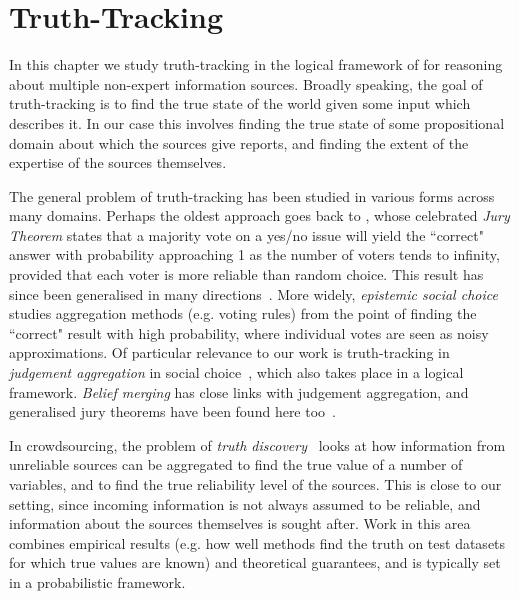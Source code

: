 \chapter{Truth-Tracking}


In this chapter we study truth-tracking in the logical framework of
\textcite{singleton_booth_22_preprint} for reasoning about multiple non-expert
information sources. Broadly speaking, the goal of truth-tracking is to find
the true state of the world given some input which describes it. In our case
this involves finding the true state of some propositional domain about which
the sources give reports, and finding the extent of the expertise of the
sources themselves.

The general problem of truth-tracking has been studied in various forms across
many domains. Perhaps the oldest approach goes back to \textcite{condorcet}, whose
celebrated \emph{Jury Theorem} states that a majority vote on a yes/no issue
will yield the ``correct" answer with probability approaching 1 as the number
of voters tends to infinity, provided that each voter is more reliable than
random choice. This result has since been generalised in many
directions~\textcite{grofman1983thirteen}. More widely, \emph{epistemic social
choice}~\cite{elkind2016rationalizations} studies aggregation methods (e.g.
voting rules) from the point of finding the ``correct" result with high
probability, where individual votes are seen as noisy approximations. Of
particular relevance to our work is truth-tracking in \emph{judgement
aggregation} in social
choice~\cite{hartmann_judgment_2012,TerzopoulouEndrissSAGT2019}, which also
takes place in a logical framework. \emph{Belief merging} has close links with
judgement aggregation, and generalised jury theorems have been found here
too~\cite{everaere_epistemic_2010}.

In crowdsourcing, the problem of \emph{truth discovery}~\cite{li_survey_2016}
looks at how information from unreliable sources can be aggregated to find the
true value of a number of variables, and to find the true reliability level of
the sources. This is close to our setting, since incoming information is not
always assumed to be reliable, and information about the sources themselves is
sought after. Work in this area combines empirical results (e.g. how well
methods find the truth on test datasets for which true values are known) and
theoretical guarantees, and is
typically set in a probabilistic framework.

